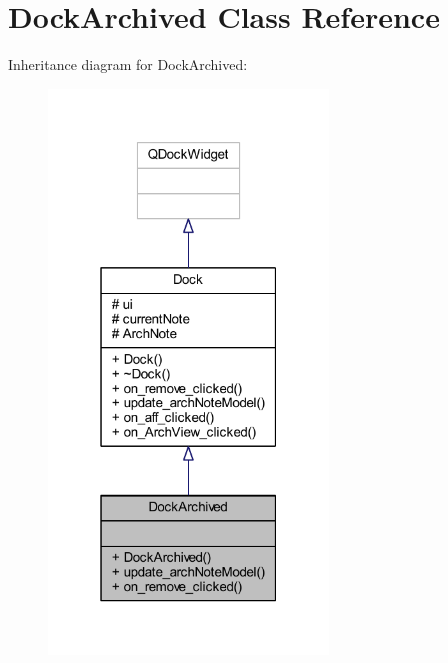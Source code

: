 \hypertarget{class_dock_archived}{}\section{Dock\+Archived Class Reference}
\label{class_dock_archived}


Inheritance diagram for Dock\+Archived\+:
\nopagebreak
\begin{figure}[H]
\begin{center}
\leavevmode
\includegraphics[width=211pt]{class_dock_archived__inherit__graph}
\end{center}
\end{figure}


